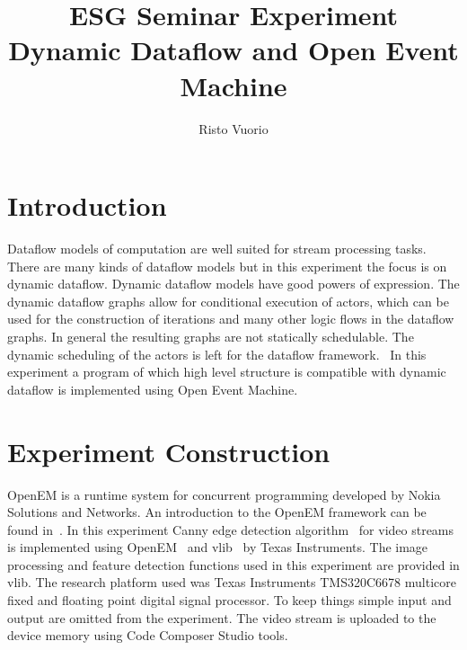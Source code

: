 \documentclass[a4paper,10pt]{article}
\begin{document}
%
\title{ESG Seminar Experiment \\ Dynamic Dataflow and Open Event Machine}

\author{Risto Vuorio}

\maketitle

\begin{abstract}
\end{abstract}

\section{Introduction}
Dataflow models of computation are well suited for stream processing tasks. There are many kinds of dataflow models but in this experiment the focus is on dynamic dataflow. Dynamic dataflow models have good powers of expression. The dynamic dataflow graphs allow for conditional execution of actors, which can be used for the construction of iterations and many other logic flows in the dataflow graphs. In general the resulting graphs are not statically schedulable. The dynamic scheduling of the actors is left for the dataflow framework.~\cite{risto-semma} In this experiment a program of which high level structure is compatible with dynamic dataflow is implemented using Open Event Machine.

\section{Experiment Construction}
OpenEM is a runtime system for concurrent programming developed by Nokia Solutions and Networks.  An introduction to the OpenEM framework can be found in~\cite{risto-dippa}. In this experiment Canny edge detection algorithm~\cite{canny1986computational} for video streams is implemented using OpenEM~\cite{openemwhite} and vlib~\cite{vlib} by Texas Instruments. The image processing and feature detection functions used in this experiment are provided in vlib. The research platform used was Texas Instruments TMS320C6678 multicore fixed and floating point digital signal processor. To keep things simple input and output are omitted from the experiment. The video stream is uploaded to the device memory using Code Composer Studio tools.
\end{document}

